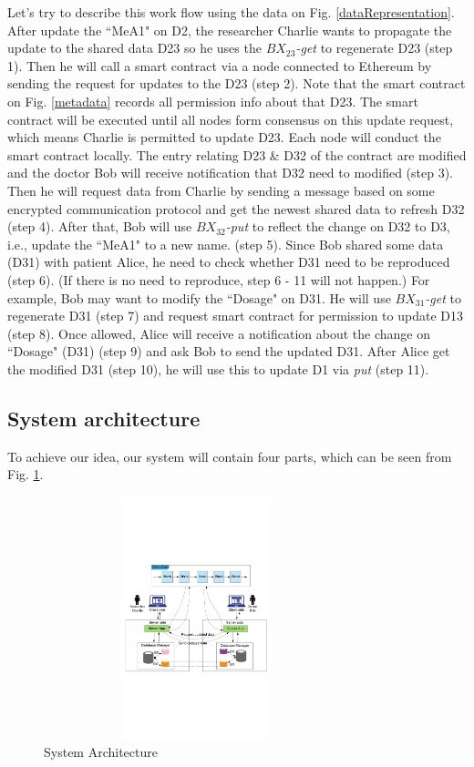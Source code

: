 \documentclass[conference]{IEEEtran}
\begin{document}
Let's try to describe this work flow using the data on Fig. \ref{dataRepresentation}. After update the ``MeA1" on D2, the researcher Charlie wants to propagate the update to the shared data D23 so he uses the \emph{$BX_{23}$-get} to regenerate D23 (step 1). Then he will call a smart contract via a node connected to Ethereum by sending the request for updates to the D23 (step 2). Note that the smart contract on Fig. \ref{metadata}  records all permission info about that D23. 
The smart contract will be executed until all nodes form consensus on this update request, which means Charlie is permitted to update D23. Each node will conduct the smart contract locally. The entry relating D23 \& D32 of the contract are modified and the doctor Bob will receive notification that D32 need to modified (step 3). Then he will request data from Charlie by sending a message based on some encrypted communication protocol and get the newest shared data to refresh D32 (step 4). After that, Bob will use \emph{$BX_{32}$-put} to reflect the change on D32 to D3, i.e., update the ``MeA1" to a new name. (step 5). Since Bob shared some data (D31) with patient Alice, he need to check whether D31 need to be reproduced (step 6). (If there is no need to reproduce, step 6 - 11 will not happen.) For example, Bob may want to modify the ``Dosage" on D31. He will use \emph{$BX_{31}$-get} to regenerate D31 (step 7) and request smart contract for permission to update D13 (step 8). Once allowed, Alice will receive a notification about the change on ``Dosage" (D31) (step 9) and ask Bob to send the updated D31. After Alice get the modified D31 (step 10), he will use this to update D1 via \emph{put} (step 11).  

\subsection{System architecture}
To achieve our idea, our system will contain four parts, which can be seen from Fig. \ref{systemArchitecture}.

\begin{figure}[htbp]
	\centerline{\includegraphics[width=250pt,height=200pt]{systemArchitecture.pdf}}
	\caption{System Architecture}
	\label{systemArchitecture}
\end{figure}
\end{document}
